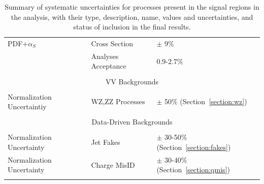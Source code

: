 \begin{table}[htbp]
\begin{center}
{\begin{tabular}{|lll|}
      PDF+$\alpha_S$     &   Cross Section  &         $\pm$ 9$\%$       \\
                                      &   Analyses Acceptance          &     $0.9$-$2.7\%$      \\
         & &                 \\
     \hline
      \multicolumn{3}{|c|}{VV Backgrounds}\\
     \hline
         &   &              \\
      Normalization Uncertaintiy             &   WZ,ZZ Processes       &         $\pm$ 50$\%$   (Section~\ref{section:wz})   \\
          &  &             \\
     \hline
      \multicolumn{3}{|c|}{Data-Driven Backgrounds}\\
     \hline
          &   &             \\
           Normalization Uncertainty                 &    Jet Fakes       &     $\pm$ 30-50$\%$ (Section~\ref{section:fakes})     \\
           Normalization Uncertainty                 &    Charge MisID    &     $\pm$ 30-40$\%$ (Section~\ref{section:qmis})      \\
          &    &             \\
     \hline
    \end{tabular}
    }
    \caption{ Summary of systematic uncertainties for processes present in the signal regions in the analysis, with their
    type, description, name, values and uncertainties, and status of inclusion in the final results.}
    \label{table:systematics_summary}
    \end{center}
    \end{table} 


